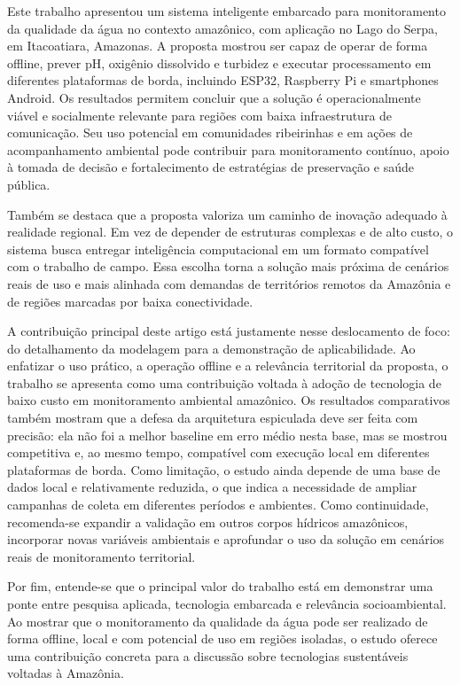 
Este trabalho apresentou um sistema inteligente embarcado para monitoramento da qualidade da \'agua no contexto amaz\^onico, com aplica\c{c}\~ao no Lago do Serpa, em Itacoatiara, Amazonas. A proposta mostrou ser capaz de operar de forma offline, prever pH, oxig\^enio dissolvido e turbidez e executar processamento em diferentes plataformas de borda, incluindo ESP32, Raspberry Pi e smartphones Android. Os resultados permitem concluir que a solu\c{c}\~ao \'e operacionalmente vi\'avel e socialmente relevante para regi\~oes com baixa infraestrutura de comunica\c{c}\~ao. Seu uso potencial em comunidades ribeirinhas e em a\c{c}\~oes de acompanhamento ambiental pode contribuir para monitoramento cont\'inuo, apoio \`a tomada de decis\~ao e fortalecimento de estrat\'egias de preserva\c{c}\~ao e sa\'ude p\'ublica.

Tamb\'em se destaca que a proposta valoriza um caminho de inova\c{c}\~ao adequado \`a realidade regional. Em vez de depender de estruturas complexas e de alto custo, o sistema busca entregar intelig\^encia computacional em um formato compat\'ivel com o trabalho de campo. Essa escolha torna a solu\c{c}\~ao mais pr\'oxima de cen\'arios reais de uso e mais alinhada com demandas de territ\'orios remotos da Amaz\^onia e de regi\~oes marcadas por baixa conectividade.

A contribui\c{c}\~ao principal deste artigo est\'a justamente nesse deslocamento de foco: do detalhamento da modelagem para a demonstra\c{c}\~ao de aplicabilidade. Ao enfatizar o uso pr\'atico, a opera\c{c}\~ao offline e a relev\^ancia territorial da proposta, o trabalho se apresenta como uma contribui\c{c}\~ao voltada \`a ado\c{c}\~ao de tecnologia de baixo custo em monitoramento ambiental amaz\^onico. Os resultados comparativos tamb\'em mostram que a defesa da arquitetura espiculada deve ser feita com precis\~ao: ela n\~ao foi a melhor baseline em erro m\'edio nesta base, mas se mostrou competitiva e, ao mesmo tempo, compat\'ivel com execu\c{c}\~ao local em diferentes plataformas de borda. Como limita\c{c}\~ao, o estudo ainda depende de uma base de dados local e relativamente reduzida, o que indica a necessidade de ampliar campanhas de coleta em diferentes per\'iodos e ambientes. Como continuidade, recomenda-se expandir a valida\c{c}\~ao em outros corpos h\'idricos amaz\^onicos, incorporar novas vari\'aveis ambientais e aprofundar o uso da solu\c{c}\~ao em cen\'arios reais de monitoramento territorial.

Por fim, entende-se que o principal valor do trabalho est\'a em demonstrar uma ponte entre pesquisa aplicada, tecnologia embarcada e relev\^ancia socioambiental. Ao mostrar que o monitoramento da qualidade da \'agua pode ser realizado de forma offline, local e com potencial de uso em regi\~oes isoladas, o estudo oferece uma contribui\c{c}\~ao concreta para a discuss\~ao sobre tecnologias sustent\'aveis voltadas \`a Amaz\^onia.

